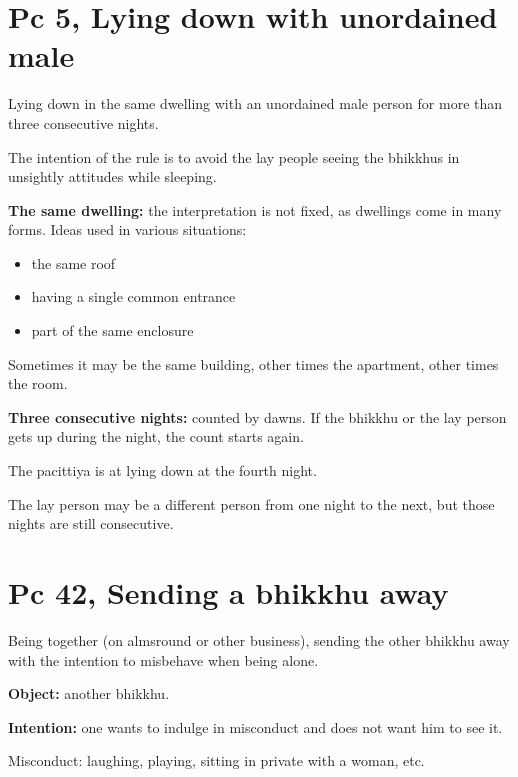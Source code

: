 \section{Pc 5, Lying down with unordained male}

\begin{multicols}{2}

Lying down in the same dwelling with an unordained male person for more
than three consecutive nights.

The intention of the rule is to avoid the lay people seeing the bhikkhus
in unsightly attitudes while sleeping.

\textbf{The same dwelling:} the interpretation is not fixed, as
dwellings come in many forms. Ideas used in various situations:

\begin{itemize}
\tightlist
\item
  the same roof
\item
  having a single common entrance
\item
  part of the same enclosure
\end{itemize}

\columnbreak

Sometimes it may be the same building, other times the apartment, other
times the room.

\textbf{Three consecutive nights:} counted by dawns. If the bhikkhu or
the lay person gets up during the night, the count starts again.

The pacittiya is at lying down at the fourth night.

The lay person may be a different person from one night to the next, but
those nights are still consecutive.

\end{multicols}
\clearpage

\section{Pc 42, Sending a bhikkhu away}

Being together (on almsround or other business), sending the other
bhikkhu away with the intention to misbehave when being alone.

\textbf{Object:} another bhikkhu.

\textbf{Intention:} one wants to indulge in misconduct and does not want
him to see it.

Misconduct: laughing, playing, sitting in private with a woman, etc.

